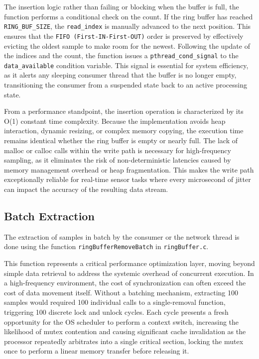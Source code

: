 The insertion logic rather than failing or blocking when the buffer is full, the function performs a conditional check on the count. If the ring buffer has reached \texttt{RING\_BUF\_SIZE}, the \texttt{read\_index} is manually advanced to the next position. This ensures that the \texttt{FIFO (First-IN-First-OUT)} order is preserved by effectively evicting the oldest sample to make room for the newest. Following the update of the indices and the count,  the function issues a \texttt{pthread\_cond\_signal} to the \texttt{data\_available} condition variable. This signal is essential for system efficiency, as it alerts any sleeping consumer thread that the buffer is no longer empty, transitioning the consumer from a suspended state back to an active processing state.

From a performance standpoint, the insertion operation is characterized by its O(1) constant time complexity. Because the implementation avoids heap interaction, dynamic resizing, or complex memory copying, the execution time remains identical whether the ring buffer is empty or nearly full. The lack of malloc or calloc calls within the write path is necessary for high-frequency sampling, as it eliminates the risk of non-deterministic latencies caused by memory management overhead or heap fragmentation. This makes the write path exceptionally reliable for real-time sensor tasks where every microsecond of jitter can impact the accuracy of the resulting data stream.

\subsection{Batch Extraction}
The extraction of samples in batch by the consumer or the network thread is done using the function \texttt{ringBufferRemoveBatch} in \texttt{ringBuffer.c}.

This function represents a critical performance optimization layer, moving beyond simple data retrieval to address the systemic overhead of concurrent execution. In a high-frequency environment, the cost of synchronization can often exceed the cost of data movement itself. Without a batching mechanism, extracting 100 samples would required 100 individual calls to a single-removal function, triggering 100 discrete lock and unlock cycles. Each cycle presents a fresh opportunity for the OS scheduler to perform a context switch, increasing the likelihood of mutex contention and causing significant cache invalidation as the processor repeatedly arbitrates into a single critical section, locking the mutex once to perform a linear memory transfer before releasing it.

